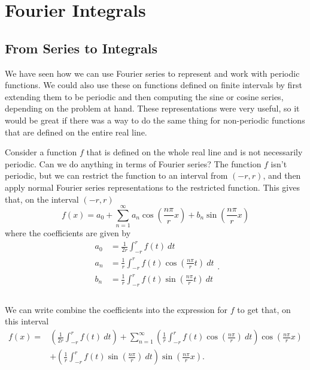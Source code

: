 \section{Fourier Integrals}
\label{fourierInt:section}



\subsection{From Series to Integrals}

We have seen how we can use Fourier series to represent and work with periodic functions. We could also use these on functions defined on finite intervals by first extending them to be periodic and then computing the sine or cosine series, depending on the problem at hand. These representations were very useful, so it would be great if there was a way to do the same thing for non-periodic functions that are defined on the entire real line. 

Consider a function $f$ that is defined on the whole real line and is not necessarily periodic. Can we do anything in terms of Fourier series? The function $f$ isn't periodic, but we can restrict the function to an interval from $(-r, r)$, and then apply normal Fourier series representations to the restricted function. This gives that, on the interval $(-r, r)$
\[ f(x) = a_0 + \sum_{n=1}^\infty a_n \cos\left(\frac{n\pi}{r}x\right) + b_n \sin\left(\frac{n\pi}{r}x\right) \] where the coefficients are given by
\[ 
\begin{split}
a_0 &= \frac{1}{2r} \int_{-r}^{r} f(t)\ dt\\ 
a_n &= \frac{1}{r} \int_{-r}^r f(t) \cos\left(\frac{n\pi}{r} t\right)\ dt \\
b_n &= \frac{1}{r} \int_{-r}^r f(t) \sin\left(\frac{n\pi}{r} t\right)\ dt \\\\
\end{split}.
\] 

We can write combine the coefficients into the expression for $f$ to get that, on this interval
\[ \begin{split} 
f(x) =&  \left( \frac{1}{2r} \int_{-r}^{r} f(t)\ dt \right)  + \sum_{n=1}^\infty \left(\frac{1}{r} \int_{-r}^r f(t) \cos\left(\frac{n\pi}{r}\right)\ dt\right) \cos\left(\frac{n\pi}{r}x\right)  \\
&+ \left(\frac{1}{r} \int_{-r}^r f(t) \sin\left(\frac{n\pi}{r}\right)\ dt\right) \sin\left(\frac{n\pi}{r}x\right).
\end{split} \]

